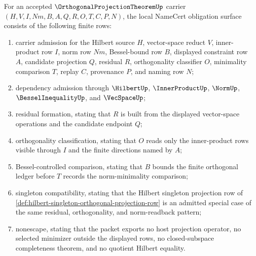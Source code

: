 \begin{theorem}\label{thm:orthogonal-projection-theorem-namecert-obligations}
For an accepted $\OrthogonalProjectionTheoremUp$ carrier $(H,V,I,Nm,B,A,Q,R,O,T,C,P,N)$, the local NameCert obligation surface consists of the following finite rows:
\begin{enumerate}
\item carrier admission for the Hilbert source $H$, vector-space reduct $V$, inner-product row $I$, norm row $Nm$, Bessel-bound row $B$, displayed constraint row $A$, candidate projection $Q$, residual $R$, orthogonality classifier $O$, minimality comparison $T$, replay $C$, provenance $P$, and naming row $N$;
\item dependency admission through $\HilbertUp$, $\InnerProductUp$, $\NormUp$, $\BesselInequalityUp$, and $\VecSpaceUp$;
\item residual formation, stating that $R$ is built from the displayed vector-space operations and the candidate endpoint $Q$;
\item orthogonality classification, stating that $O$ reads only the inner-product rows visible through $I$ and the finite directions named by $A$;
\item Bessel-controlled comparison, stating that $B$ bounds the finite orthogonal ledger before $T$ records the norm-minimality comparison;
\item singleton compatibility, stating that the Hilbert singleton projection row of \autoref{def:hilbert-singleton-orthogonal-projection-row} is an admitted special case of the same residual, orthogonality, and norm-readback pattern;
\item nonescape, stating that the packet exports no host projection operator, no selected minimizer outside the displayed rows, no closed-subspace completeness theorem, and no quotient Hilbert equality.
\end{enumerate}
\end{theorem}
